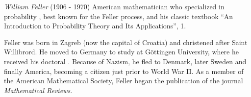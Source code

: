 \documentclass[12pt]{article}
\begin{document}
\emph{William Feller} (1906 - 1970) American mathematician who specialized in probability , best known for the Feller process, and his classic textbook ``An Introduction to Probability Theory and Its Applications'',  1.

Feller was born in Zagreb (now the capital of Croatia) and christened after Saint Willibrord. He moved to Germany to study at G\"{o}ttingen University, where he received his doctoral . Because of Nazism, he fled to Denmark, later Sweden and finally America, becoming a citizen just prior to World War II. As a member of the American Mathematical Society, Feller began the publication of the journal {\it Mathematical Reviews}.
\end{document}

